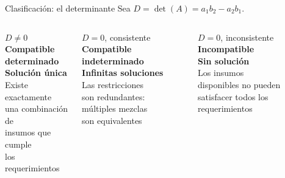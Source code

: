 \documentclass[11pt, aspectratio=169]{beamer}
\begin{document}
\begin{frame}{Clasificación: el determinante}
  Sea $D = \det(A) = a_1 b_2 - a_2 b_1$.

  \vspace{0.5em}
  \begin{columns}[T]
      \begin{exampleblock}{$D \neq 0$}
        \centering\textbf{Compatible\\determinado}\\[4pt]
        \textbf{Solución única}\\[4pt]
        Existe exactamente\\una combinación de\\insumos que cumple\\los requerimientos
      \end{exampleblock}

      \begin{block}{$D = 0$, consistente}
        \centering\textbf{Compatible\\indeterminado}\\[4pt]
        \textbf{Infinitas soluciones}\\[4pt]
        Las restricciones\\son redundantes:\\múltiples mezclas\\son equivalentes
      \end{block}

      \begin{alertblock}{$D = 0$, inconsistente}
        \centering\textbf{Incompatible}\\[4pt]
        \textbf{Sin solución}\\[4pt]
        Los insumos\\disponibles no pueden\\satisfacer todos los\\requerimientos
      \end{alertblock}
  \end{columns}
\end{frame}
\end{document}

